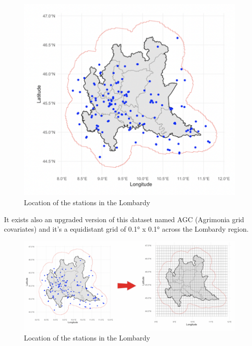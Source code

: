 \begin{figure} [h]
    \centering
   \includegraphics[width=\textwidth,height=\textheight,keepaspectratio]{Images/Zenodo/Agrimonia-dataset.png}
    \caption{Location of the stations in the Lombardy}
    \label{fig:mapLombardy}
\end{figure}
It exists also an upgraded version of this dataset named AGC (Agrimonia grid covariates) and it's a equidistant grid of 0.1° x 0.1° across the Lombardy region.
\begin{figure} [h]
    \centering
   \includegraphics[width=\textwidth,height=\textheight,keepaspectratio]{Images/Zenodo/AGC.png}
    \caption{Location of the stations in the Lombardy}
    \label{fig:mapLombardy}
\end{figure}
